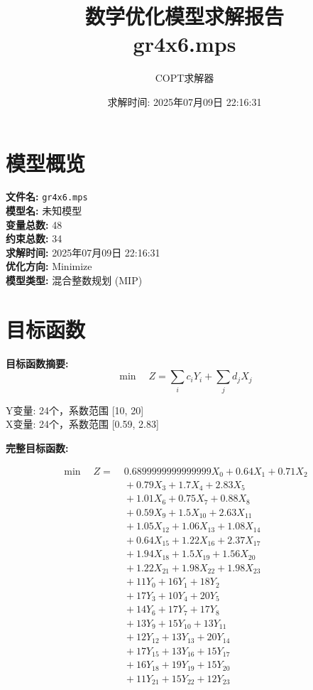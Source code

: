 \documentclass[a4paper,10pt]{article}
\title{数学优化模型求解报告\\{\large gr4x6.mps}}
\author{COPT求解器}
\date{求解时间: 2025年07月09日 22:16:31}
\begin{document}
\maketitle
\tableofcontents
\newpage

\section{模型概览}

\textbf{文件名:} \texttt{gr4x6.mps} \\
\textbf{模型名:} 未知模型 \\
\textbf{变量总数:} 48 \\
\textbf{约束总数:} 34 \\
\textbf{求解时间:} 2025年07月09日 22:16:31 \\
\textbf{优化方向:} Minimize \\

\textbf{模型类型:} 混合整数规划 (MIP)

\section{目标函数}

\textbf{目标函数摘要:}
\begin{equation}
\min \quad Z = \sum_{i} c_i Y_i + \sum_{j} d_j X_j
\end{equation}

Y变量: 24个，系数范围 [10, 20] \\
X变量: 24个，系数范围 [0.59, 2.83]

\textbf{完整目标函数:}

\allowdisplaybreaks
{\small
\begin{align}
\min \quad Z = &\; 0.6899999999999999 X_{0} + 0.64 X_{1} + 0.71 X_{2} \\[0.3ex]
&\;  + 0.79 X_{3} + 1.7 X_{4} + 2.83 X_{5} \\[0.3ex]
&\;  + 1.01 X_{6} + 0.75 X_{7} + 0.88 X_{8} \\[0.3ex]
&\;  + 0.59 X_{9} + 1.5 X_{10} + 2.63 X_{11} \\[0.3ex]
&\;  + 1.05 X_{12} + 1.06 X_{13} + 1.08 X_{14} \\[0.3ex]
&\;  + 0.64 X_{15} + 1.22 X_{16} + 2.37 X_{17} \\[0.3ex]
&\;  + 1.94 X_{18} + 1.5 X_{19} + 1.56 X_{20} \\[0.3ex]
&\;  + 1.22 X_{21} + 1.98 X_{22} + 1.98 X_{23} \\[0.3ex]
&\;  + 11 Y_{0} + 16 Y_{1} + 18 Y_{2} \\[0.3ex]
&\;  + 17 Y_{3} + 10 Y_{4} + 20 Y_{5} \\[0.5ex]\allowbreak
&\;  + 14 Y_{6} + 17 Y_{7} + 17 Y_{8} \\[0.3ex]
&\;  + 13 Y_{9} + 15 Y_{10} + 13 Y_{11} \\[0.3ex]
&\;  + 12 Y_{12} + 13 Y_{13} + 20 Y_{14} \\[0.3ex]
&\;  + 17 Y_{15} + 13 Y_{16} + 15 Y_{17} \\[0.3ex]
&\;  + 16 Y_{18} + 19 Y_{19} + 15 Y_{20} \\[0.3ex]
&\;  + 11 Y_{21} + 15 Y_{22} + 12 Y_{23}\nonumber
\end{align}
}
\end{document}
